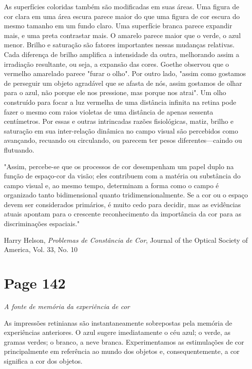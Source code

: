 \documentclass[a4paper]{article}
\begin{document}
As superfícies coloridas também são modificadas em suas áreas. Uma figura de cor clara em uma área escura parece maior do que uma figura de cor escura do mesmo tamanho em um fundo claro. Uma superfície branca parece expandir mais, e uma preta contrastar mais. O amarelo parece maior que o verde, o azul menor. Brilho e saturação são fatores importantes nessas mudanças relativas. Cada diferença de brilho amplifica a intensidade da outra, melhorando assim a irradiação resultante, ou seja, a expansão das cores. Goethe observou que o vermelho amarelado parece "furar o olho". Por outro lado, "assim como gostamos de perseguir um objeto agradável que se afasta de nós, assim gostamos de olhar para o azul, não porque ele nos pressione, mas porque nos atrai". Um olho construído para focar a luz vermelha de uma distância infinita na retina pode fazer o mesmo com raios violetas de uma distância de apenas sessenta centímetros. Por essas e outras intrincadas razões fisiológicas, matiz, brilho e saturação em sua inter-relação dinâmica no campo visual são percebidos como avançando, recuando ou circulando, ou parecem ter pesos diferentes---caindo ou flutuando.

"Assim, percebe-se que os processos de cor desempenham um papel duplo na função de espaço-cor da visão; eles contribuem com a matéria ou substância do campo visual e, ao mesmo tempo, determinam a forma como o campo é organizado tanto bidimensional quanto tridimensionalmente. Se a cor ou o espaço devem ser considerados primários, é muito cedo para decidir, mas as evidências atuais apontam para o crescente reconhecimento da importância da cor para as discriminações espaciais."

\textbullet{} Harry Helson, \textit{Problemas de Constância de Cor}, Journal of the Optical Society of America, Vol. 33, No. 10

\newpage
\section*{Page 142}

\begin{center}
\large\textit{A fonte de memória da experiência de cor}
\end{center}

As impressões retinianas são instantaneamente sobrepostas pela memória de experiências anteriores. O azul sugere imediatamente o céu azul; o verde, as gramas verdes; o branco, a neve branca. Experimentamos as estimulações de cor principalmente em referência ao mundo dos objetos e, consequentemente, a cor significa a cor dos objetos.
\end{document}
